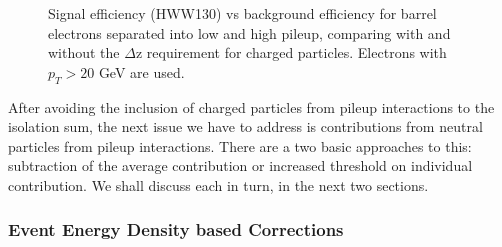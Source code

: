 \begin{figure}[!htbp]
\begin{center}
\caption{ Signal efficiency (HWW130) vs background efficiency for barrel electrons separated into 
low and high pileup, comparing with and without the $\Delta$z requirement for charged particles.
Electrons with $p_{T} > 20$ GeV are used. }
\label{fig:IsoPerformance_EleBarrel_dZCut}
\end{center}
\end{figure}

After avoiding the inclusion of charged particles from pileup interactions to the isolation sum, 
the next issue we have to address is contributions from neutral particles from pileup interactions.
There are a two basic approaches to this: subtraction of the average contribution or increased
threshold on individual contribution. We shall discuss each in turn, in the next two sections.


\subsubsection{Event Energy Density based Corrections}
\label{sec:CorrectionBasedIsolation}


